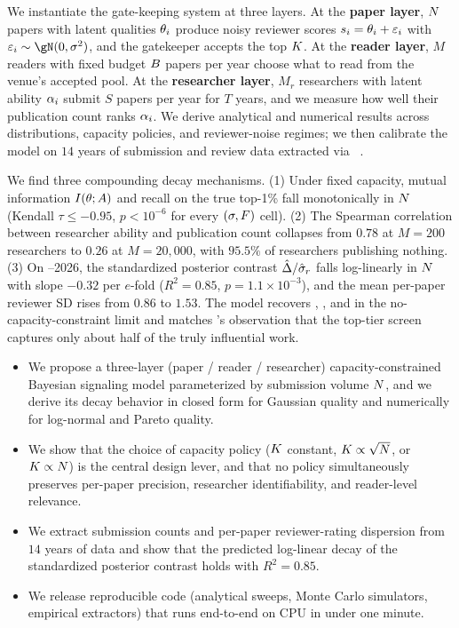  We instantiate the gate-keeping system at three layers. At the {\bf paper layer}, $N$ papers with latent qualities $\theta_i$ produce noisy reviewer scores $s_i = \theta_i + \varepsilon_i$ with $\varepsilon_i \sim \gN(0,\sigrev^2)$, and the gatekeeper accepts the top $K$. At the {\bf reader layer}, $M$ readers with fixed budget $B$ papers per year choose what to read from the venue's accepted pool. At the {\bf researcher layer}, $M_r$ researchers with latent ability $\alpha_i$ submit $S$ papers per year for $T$ years, and we measure how well their publication count ranks $\alpha_i$. We derive analytical and numerical results across distributions, capacity policies, and reviewer-noise regimes; we then calibrate the model on $14$ years of \iclr submission and review data extracted via \papercopilot~\citep{yang2025papercopilot}.

 We find three compounding decay mechanisms. (1) Under fixed capacity, mutual information $I(\theta;A)$ and recall on the true top-1\% fall monotonically in $N$ (Kendall $\tau \le -0.95$, $p<10^{-6}$ for every $(\sigma, F)$ cell). (2) The Spearman correlation between researcher ability and publication count collapses from $0.78$ at $M{=}200$ researchers to $0.26$ at $M{=}20{,}000$, with $95.5\%$ of researchers publishing nothing. (3) On --2026, the standardized posterior contrast $\hat{\Delta} / \hat{\sigma}_r$ falls log-linearly in $N$ with slope $-0.32$ per $e$-fold ($R^2 = 0.85$, $p = 1.1\times10^{-3}$), and the mean per-paper reviewer SD rises from $0.86$ to $1.53$. The model recovers \citet{akerlof1970lemons}, \citet{spence1973job}, and \citet{long2023lemons} in the no-capacity-constraint limit and matches \citet{heckman2019tyranny}'s observation that the top-tier screen captures only about half of the truly influential work.

\begin{itemize}[leftmargin=*,itemsep=0pt,topsep=0pt]
    \item We propose a three-layer (paper / reader / researcher) capacity-constrained Bayesian signaling model parameterized by submission volume $N$, and we derive its decay behavior in closed form for Gaussian quality and numerically for log-normal and Pareto quality.
    \item We show that the choice of capacity policy ($K$ constant, $K \propto \sqrt{N}$, or $K \propto N$) is the central design lever, and that no policy simultaneously preserves per-paper precision, researcher identifiability, and reader-level relevance.
    \item We extract submission counts and per-paper reviewer-rating dispersion from $14$ years of \iclr data and show that the predicted log-linear decay of the standardized posterior contrast holds with $R^2 = 0.85$.
    \item We release reproducible code (analytical sweeps, Monte Carlo simulators, empirical extractors) that runs end-to-end on CPU in under one minute.
\end{itemize}

